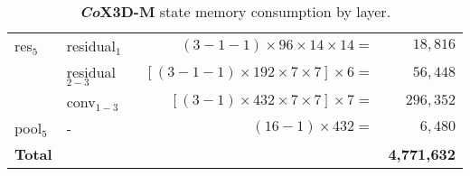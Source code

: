 \begin{table}
\begin{center}
\begin{tabular}{llrr}
    \midrule
    res$_5$         & residual$_1$          & $(3-1-1) \times 96 \times 14 \times 14 =$                       & $18{,}816$ \\
                    & residual$_{2-3}$      & $\left[(3-1-1) \times 192 \times 7 \times 7\right] \times 6 =$  & $56{,}448$ \\
                    & conv$_{1-3}$          & $\left[(3-1) \times 432 \times 7 \times 7\right] \times 7 =$  & $296{,}352$ \\
    \midrule
    pool$_5$        & -                     & $(16-1) \times 432 =$                                         & $6{,}480$ \\
    \bottomrule
    \textbf{Total}  &                       &                                                               & \textbf{4,771,632} \\ %
    \bottomrule
\end{tabular}
\end{center}
\caption{\textbf{\textit{Co}X3D-M} state memory consumption by layer. }
\label{tab:cox3dm-mem-calc}
\end{table}


